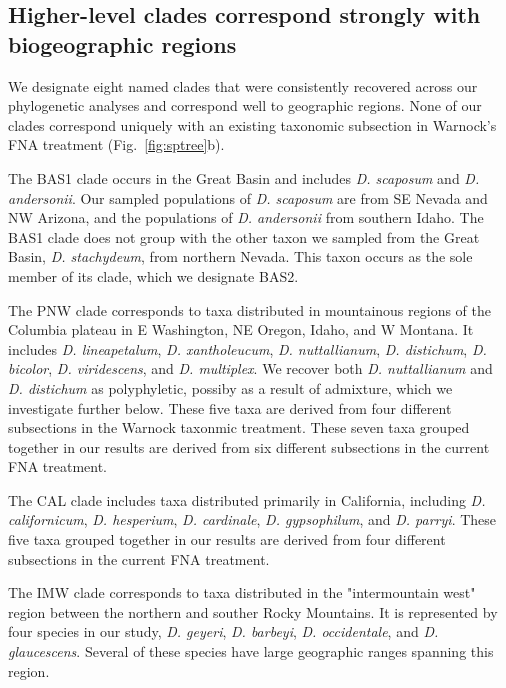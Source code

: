 \documentclass[11pt]{article}
\begin{document}
\subsection{Higher-level clades correspond strongly with biogeographic regions}

We designate eight named clades that were consistently recovered across our
phylogenetic analyses and correspond well to geographic regions. None of our
clades correspond uniquely with an existing taxonomic subsection in Warnock's
FNA treatment (Fig.~\ref{fig:sptree}b). 

The BAS1 clade occurs in the Great Basin and includes \emph{D. scaposum} and
\emph{D. andersonii}. 
Our sampled populations of \emph{D. scaposum} are from SE Nevada and NW Arizona, 
and the populations of \emph{D. andersonii} from southern Idaho. 
% 
The BAS1 clade does not group with the other taxon we sampled from the Great
Basin, \emph{D. stachydeum}, from northern Nevada. This taxon occurs as the 
sole member of its clade, which we designate BAS2.

The PNW clade corresponds to taxa distributed in mountainous regions of the Columbia 
plateau in E Washington, NE Oregon, Idaho, and W Montana. It includes \emph{D. lineapetalum}, 
\emph{D. xantholeucum}, \emph{D. nuttallianum}, \emph{D. distichum}, \emph{D. bicolor}, 
\emph{D. viridescens}, and \emph{D. multiplex}. We recover both \emph{D. nuttallianum}
and \emph{D. distichum} as polyphyletic, possiby as a result of admixture, which we
investigate further below. These five taxa are derived from four
different subsections in the Warnock taxonmic treatment. These seven taxa grouped
together in our results are derived from six different subsections in the current 
FNA treatment.

The CAL clade includes taxa distributed primarily in California, including 
\emph{D. californicum}, \emph{D. hesperium}, \emph{D. cardinale}, 
\emph{D. gypsophilum}, and \emph{D. parryi}. These five taxa grouped together in
our results are derived from four different subsections in the current FNA treatment.

The IMW clade corresponds to taxa distributed in the "intermountain west" region 
between the northern and souther Rocky Mountains.
It is represented by four species in our study, 
\emph{D. geyeri}, \emph{D. barbeyi}, \emph{D. occidentale}, and \emph{D. glaucescens}.
Several of these species have large geographic ranges spanning this region.
\end{document}

